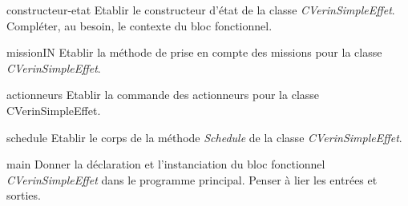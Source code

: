 {    \begin{question}{constructeur-etat}
        Etablir le constructeur d'état de la classe \emph{CVerinSimpleEffet}. Compléter, au besoin, le contexte du bloc fonctionnel. 
    \end{question}

    \begin{question}{missionIN}
        Etablir la méthode de prise en compte des missions pour la classe \emph{CVerinSimpleEffet}.
    \end{question}

    \begin{question}{actionneurs}
        Etablir la commande des actionneurs pour la classe {CVerinSimpleEffet}.
    \end{question}

    \begin{question}{schedule}
        Etablir le corps de la méthode \emph{Schedule} de la classe \emph{CVerinSimpleEffet}.
    \end{question}

    \begin{question}{main}
        Donner la déclaration et l'instanciation du bloc fonctionnel \emph{CVerinSimpleEffet} dans le programme principal. Penser à lier les entrées et sorties.
    \end{question}
}